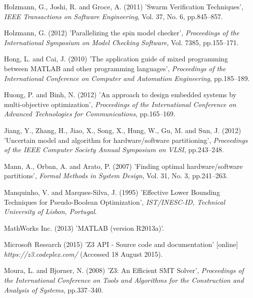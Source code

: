 \documentclass{doublecol-new}
\theoremstyle{TH}{
\newtheorem{lemma}{Lemma}
\newtheorem{theorem}[lemma]{Theorem}
\newtheorem{corrolary}[lemma]{Corrolary}
\newtheorem{conjecture}[lemma]{Conjecture}
\newtheorem{proposition}[lemma]{Proposition}
\newtheorem{claim}[lemma]{Claim}
\newtheorem{stheorem}[lemma]{Wrong Theorem}
\newtheorem{algorithm}{Algorithm}
}
\theoremstyle{THrm}{
\newtheorem{definition}{Definition}[section]
\newtheorem{question}{Question}[section]
\newtheorem{remark}{Remark}
\newtheorem{scheme}{Scheme}
}
\theoremstyle{THhit}{
\newtheorem{case}{Case}[section]
}
\begin{document}
\begin{thebibliography}{10}
Holzmann, G., Joshi, R. and Groce, A. (2011) 'Swarm Verification Techniques', {\it IEEE Transactions on Software Engineering}, Vol. 37, No. 6, pp.845--857.

Holzmann, G. (2012) 'Parallelizing the spin model checker', {\it Proceedings of the International Symposium on Model Checking Software}, Vol. 7385, pp.155--171.

Hong, L. and Cai, J. (2010) 'The application guide of mixed programming between MATLAB and other programming languages', {\it Proceedings of the International Conference on Computer and Automation Engineering}, pp.185--189.

Huong, P. and Binh, N. (2012) 'An approach to design embedded systems by multi-objective optimization', {\it
Proceedings of the International Conference on Advanced Technologies for Communications}, pp.165--169.

Jiang, Y., Zhang, H., Jiao, X., Song, X., Hung, W., Gu, M. and Sun, J. (2012) 'Uncertain model and algorithm for
hardware/software partitioning', {\it Proceedings of the IEEE Computer Society Annual Symposium on VLSI}, pp.243--248.

Mann, A., Orban, A. and Arato, P. (2007) 'Finding optimal hardware/software partitions', {\it Formal Methods in System Design}, Vol. 31, No. 3, pp.241--263.

Manquinho, V. and Marques-Silva, J. (1995) 'Effective Lower Bounding Techniques for Pseudo-Boolean Optimization', {\it IST/INESC-ID, Technical University of Lisbon, Portugal}.

MathWorks Inc. (2013) 'MATLAB (version R2013a)'.

Microsoft Research (2015) 'Z3 API - Source code and documentation' [online] {\it https://z3.codeplex.com/} (Accessed 18 August 2015).

Moura, L. and Bjorner, N. (2008) 'Z3: An Efficient SMT Solver', {\it Proceedings of the International Conference on Tools and Algorithms for the Construction and Analysis of Systems}, pp.337--340.


\end{thebibliography}
\end{document}
